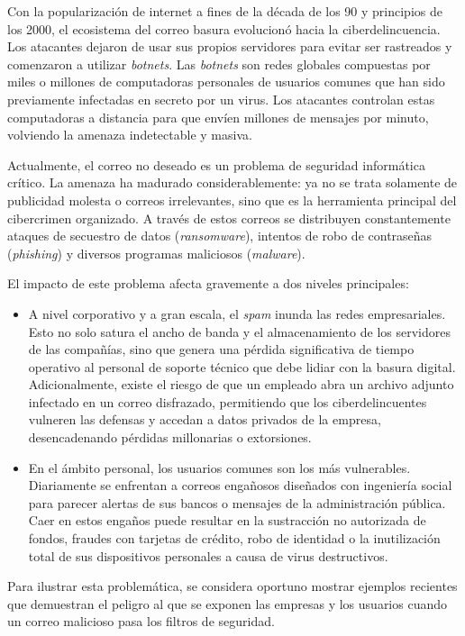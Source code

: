\documentclass[a4paper,11pt ,openany]{book}
\begin{document}
Con la popularización de internet a fines de la década de los 90 y principios de los 2000, el ecosistema del correo basura evolucionó hacia la ciberdelincuencia. Los atacantes dejaron de usar sus propios servidores para evitar ser rastreados y comenzaron a utilizar \textit{botnets}. Las \textit{botnets} son redes globales compuestas por miles o millones de computadoras personales de usuarios comunes que han sido previamente infectadas en secreto por un virus. Los atacantes controlan estas computadoras  a distancia para que envíen millones de mensajes por minuto, volviendo la amenaza indetectable y masiva.

Actualmente, el correo no deseado es un problema de seguridad informática crítico. La amenaza ha madurado considerablemente: ya no se trata solamente de publicidad molesta o correos irrelevantes, sino que es la herramienta principal del cibercrimen organizado. A través de estos correos se distribuyen constantemente ataques de secuestro de datos (\textit{ransomware}), intentos de robo de contraseñas (\textit{phishing}) y diversos programas maliciosos (\textit{malware}).

El impacto de este problema afecta gravemente a dos niveles principales:
\begin{itemize}
\item A nivel corporativo y a gran escala, el \textit{spam} inunda las redes empresariales. Esto no solo satura el ancho de banda y el almacenamiento de los servidores de las compañías, sino que genera una pérdida significativa de tiempo operativo al personal de soporte técnico que debe lidiar con la basura digital. Adicionalmente, existe el riesgo de que un empleado abra un archivo adjunto infectado en un correo disfrazado, permitiendo que los ciberdelincuentes vulneren las defensas y accedan a datos privados de la empresa, desencadenando pérdidas millonarias o extorsiones.

\item En el ámbito personal, los usuarios comunes son los más vulnerables. Diariamente se enfrentan a correos engañosos diseñados con ingeniería social para parecer alertas de sus bancos o mensajes de la administración pública. Caer en estos engaños puede resultar en la sustracción no autorizada de fondos, fraudes con tarjetas de crédito, robo de identidad o la inutilización total de sus dispositivos personales a causa de virus destructivos.
\end{itemize}

Para ilustrar esta problemática, se considera oportuno mostrar ejemplos recientes que demuestran el peligro al que se exponen las empresas y los usuarios cuando un correo malicioso pasa los filtros de seguridad.
\end{document}
